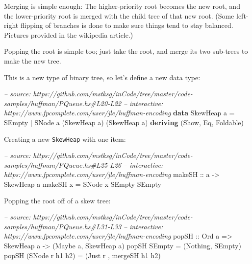 \documentclass[]{article}
\newenvironment{Shaded}{}{}
\newcommand{\KeywordTok}[1]{\textcolor[rgb]{0.00,0.44,0.13}{\textbf{#1}}}
\newcommand{\DataTypeTok}[1]{\textcolor[rgb]{0.56,0.13,0.00}{#1}}
\newcommand{\CommentTok}[1]{\textcolor[rgb]{0.38,0.63,0.69}{\textit{#1}}}
\newcommand{\OtherTok}[1]{\textcolor[rgb]{0.00,0.44,0.13}{#1}}
\newcommand{\FunctionTok}[1]{\textcolor[rgb]{0.02,0.16,0.49}{#1}}
\newcommand{\NormalTok}[1]{#1}
\begin{document}
Merging is simple enough: The higher-priority root becomes the new root, and the
lower-priority root is merged with the child tree of that new root. (Some
left-right flipping of branches is done to make sure things tend to stay
balanced. Pictures provided in the wikipedia article.)

Popping the root is simple too; just take the root, and merge its two sub-trees
to make the new tree.

This is a new type of binary tree, so let's define a new data type:

\begin{Shaded}
\begin{Highlighting}[]
\CommentTok{-- source: https://github.com/mstksg/inCode/tree/master/code-samples/huffman/PQueue.hs#L20-L22}
\CommentTok{-- interactive: https://www.fpcomplete.com/user/jle/huffman-encoding}
\KeywordTok{data} \DataTypeTok{SkewHeap}\NormalTok{ a }\FunctionTok{=} \DataTypeTok{SEmpty}
                \FunctionTok{|} \DataTypeTok{SNode}\NormalTok{ a (}\DataTypeTok{SkewHeap}\NormalTok{ a) (}\DataTypeTok{SkewHeap}\NormalTok{ a)}
                \KeywordTok{deriving}\NormalTok{ (}\DataTypeTok{Show}\NormalTok{, }\DataTypeTok{Eq}\NormalTok{, }\DataTypeTok{Foldable}\NormalTok{)}
\end{Highlighting}
\end{Shaded}

Creating a new \texttt{SkewHeap} with one item:

\begin{Shaded}
\begin{Highlighting}[]
\CommentTok{-- source: https://github.com/mstksg/inCode/tree/master/code-samples/huffman/PQueue.hs#L25-L26}
\CommentTok{-- interactive: https://www.fpcomplete.com/user/jle/huffman-encoding}
\OtherTok{makeSH ::}\NormalTok{ a }\OtherTok{->} \DataTypeTok{SkewHeap}\NormalTok{ a}
\NormalTok{makeSH x }\FunctionTok{=} \DataTypeTok{SNode}\NormalTok{ x }\DataTypeTok{SEmpty} \DataTypeTok{SEmpty}
\end{Highlighting}
\end{Shaded}

Popping the root off of a skew tree:

\begin{Shaded}
\begin{Highlighting}[]
\CommentTok{-- source: https://github.com/mstksg/inCode/tree/master/code-samples/huffman/PQueue.hs#L31-L33}
\CommentTok{-- interactive: https://www.fpcomplete.com/user/jle/huffman-encoding}
\OtherTok{popSH ::} \DataTypeTok{Ord}\NormalTok{ a }\OtherTok{=>} \DataTypeTok{SkewHeap}\NormalTok{ a }\OtherTok{->}\NormalTok{ (}\DataTypeTok{Maybe}\NormalTok{ a, }\DataTypeTok{SkewHeap}\NormalTok{ a)}
\NormalTok{popSH }\DataTypeTok{SEmpty}          \FunctionTok{=}\NormalTok{ (}\DataTypeTok{Nothing}\NormalTok{, }\DataTypeTok{SEmpty}\NormalTok{)}
\NormalTok{popSH (}\DataTypeTok{SNode}\NormalTok{ r h1 h2) }\FunctionTok{=}\NormalTok{ (}\DataTypeTok{Just}\NormalTok{ r , mergeSH h1 h2)}
\end{Highlighting}
\end{Shaded}
\end{document}

